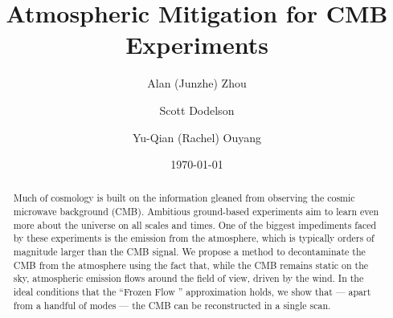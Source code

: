 \documentclass[%
reprint,%
preprintnumbers,
nofootinbib,
amsmath,amssymb,
aps,
 prd,
]{revtex4-2}
\begin{document}

\title{Atmospheric Mitigation for CMB Experiments}

\author{Alan (Junzhe) Zhou}

\author{Scott Dodelson}

\author{Yu-Qian (Rachel) Ouyang }
\date{\today}

\begin{abstract}
Much of cosmology is built on the information gleaned from observing the cosmic microwave background (CMB). Ambitious ground-based experiments aim to learn even more about the universe on all scales and times. One of the biggest impediments faced by these experiments is the emission from the atmosphere, which is typically orders of magnitude larger than the CMB signal. We propose a method to decontaminate the CMB from the atmosphere using the fact that, while the CMB remains static on the sky, atmospheric emission flows around the field of view, driven by the wind. In the ideal conditions that the ``Frozen Flow '' approximation holds, we show that --- apart from a handful of modes --- the CMB can be reconstructed in a single scan.
\end{abstract}

\maketitle


% 
% 

%
% 
% 
% 


\appendix

%
%
%
% 

%
% 
% 
\end{document}
